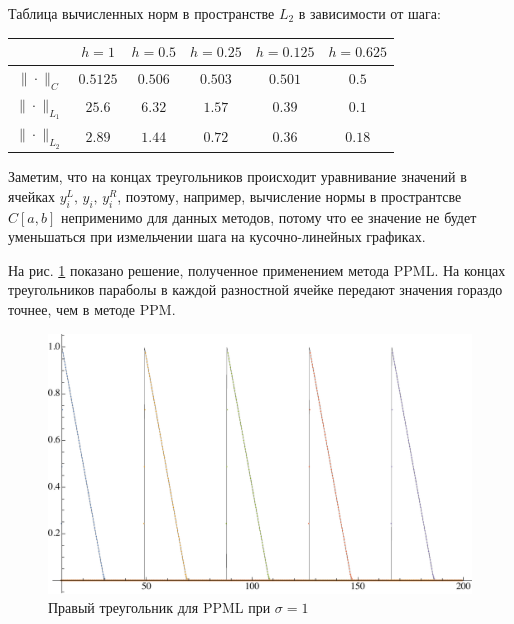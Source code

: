 \documentclass[12pt,a4paper]{article}
\newcommand{\picref}[1]{рис. \ref{#1}}
\begin{document}
    Таблица вычисленных норм в пространстве $ L_2 $ в зависимости от шага:

    \begin{center}
        \begin{tabular}{ |c|c|c|c|c|c| } 
         \hline
          & $ h=1 $ &  $ h=0.5$ &  $ h=0.25 $ &  $ h=0.125 $ &  $ h=0.625 $ \\ 
         \hline
         $\| \cdot \|_{C}$ & $0.5125$ & $0.506$ & $0.503$ & $0.501$ & $0.5$
         \\
         \hline
         $\| \cdot \|_{L_1}$ & $25.6$ & $6.32$ & $1.57$ & $0.39$ & $0.1$
         \\
         \hline
         $\| \cdot \|_{L_2}$ & $2.89$ & $1.44$ & $0.72$ & $0.36$ & $0.18$ \\
         \hline 
        \end{tabular}
    \end{center}

    Заметим, что на концах треугольников происходит уравнивание значений в ячейках $ y_i^L,\, y_i,\, y_i^R $, поэтому, например, вычисление нормы в пространтсве $C[a,b]$ неприменимо для данных методов, потому что ее значение не будет уменьшаться при измельчении шага на кусочно-линейных графиках.

    \pagebreak

    На \picref{fig:ppml_rightTriangle_1} показано решение, полученное применением метода PPML. На концах треугольников параболы в каждой разностной ячейке передают значения гораздо точнее, чем в методе PPM.

    \begin{figure}[h]
        \centering
        \includegraphics[width=\textwidth]{sigma=1./advectionPPML_rightTriangle.pdf}
        \caption{Правый треугольник для PPML при $ \sigma = 1 $}
        \label{fig:ppml_rightTriangle_1}
    \end{figure}
\end{document}
